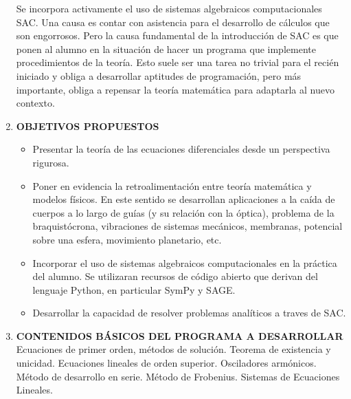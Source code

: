 \documentclass[12pt]{article}
\begin{document}
\begin{enumerate}
	Se incorpora activamente el uso de sistemas algebraicos computacionales SAC.  Una causa es contar con asistencia para el desarrollo de cálculos que son engorrosos. Pero la causa fundamental de la introducción de SAC es que ponen al alumno en la situación de hacer un programa que implemente procedimientos de la teoría. Esto suele ser una tarea no trivial para el recién iniciado y obliga a desarrollar aptitudes de programación, pero más importante, obliga a repensar la teoría matemática para adaptarla al nuevo contexto.


 
 \item \textbf{OBJETIVOS PROPUESTOS}

          \begin{itemize}
	    \item  Presentar la teoría de las ecuaciones diferenciales desde un perspectiva rigurosa.
	    
	    

	    \item  Poner en evidencia la retroalimentación entre teoría matemática y modelos físicos. En este sentido se desarrollan aplicaciones a la caída de cuerpos a lo largo de guías (y su relación con la óptica), problema de la braquistócrona, vibraciones de sistemas mecánicos, membranas,  potencial sobre una esfera, movimiento planetario, etc.

	    
	    
	    \item  Incorporar el uso de sistemas algebraicos computacionales en la práctica del  alumno. Se utilizaran recursos de código abierto que derivan del lenguaje Python, en particular SymPy y SAGE.

        \item  Desarrollar la capacidad de resolver problemas analíticos a traves de SAC.
        
        
       \end{itemize}







 \item\textbf{CONTENIDOS BÁSICOS DEL PROGRAMA A DESARROLLAR}
    Ecuaciones de primer orden, métodos de solución.  Teorema de existencia y unicidad. Ecuaciones lineales de orden superior. Osciladores armónicos.   Método de desarrollo en serie. Método de Frobenius.     Sistemas de Ecuaciones Lineales.


\end{enumerate}
\end{document}

